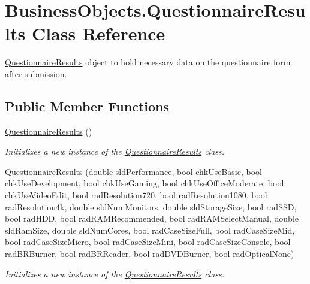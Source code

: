 \hypertarget{class_business_objects_1_1_questionnaire_results}{}\section{Business\+Objects.\+Questionnaire\+Results Class Reference}
\label{class_business_objects_1_1_questionnaire_results}


\hyperlink{class_business_objects_1_1_questionnaire_results}{Questionnaire\+Results} object to hold necessary data on the questionnaire form after submission.  


\subsection*{Public Member Functions}
\begin{DoxyCompactItemize}
\item 
\hyperlink{class_business_objects_1_1_questionnaire_results_af03bf5cea4bc3c29bb2a4b111b6e6a2c}{Questionnaire\+Results} ()
\begin{DoxyCompactList}\small\item\em Initializes a new instance of the \hyperlink{class_business_objects_1_1_questionnaire_results}{Questionnaire\+Results} class. \end{DoxyCompactList}\item 
\hyperlink{class_business_objects_1_1_questionnaire_results_a4e99b6de8ad5c240763baa74ebae2ca4}{Questionnaire\+Results} (double sld\+Performance, bool chk\+Use\+Basic, bool chk\+Use\+Development, bool chk\+Use\+Gaming, bool chk\+Use\+Office\+Moderate, bool chk\+Use\+Video\+Edit, bool rad\+Resolution720, bool rad\+Resolution1080, bool rad\+Resolution4k, double sld\+Num\+Monitors, double sld\+Storage\+Size, bool rad\+S\+SD, bool rad\+H\+DD, bool rad\+R\+A\+M\+Recommended, bool rad\+R\+A\+M\+Select\+Manual, double sld\+Ram\+Size, double sld\+Num\+Cores, bool rad\+Case\+Size\+Full, bool rad\+Case\+Size\+Mid, bool rad\+Case\+Size\+Micro, bool rad\+Case\+Size\+Mini, bool rad\+Case\+Size\+Console, bool rad\+B\+R\+Burner, bool rad\+B\+R\+Reader, bool rad\+D\+V\+D\+Burner, bool rad\+Optical\+None)
\begin{DoxyCompactList}\small\item\em Initializes a new instance of the \hyperlink{class_business_objects_1_1_questionnaire_results}{Questionnaire\+Results} class. \end{DoxyCompactList}\end{DoxyCompactItemize}
